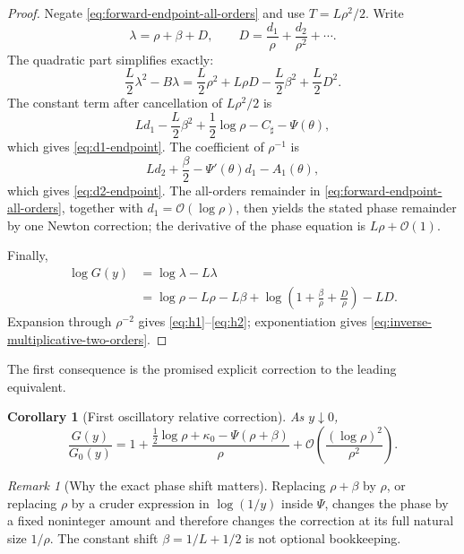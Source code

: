 \documentclass[11pt,oneside]{article}
\numberwithin{equation}{section}
\newtheorem{corollary}[theorem]{Corollary}
\theoremstyle{definition}
\theoremstyle{remark}
\newtheorem{remark}[theorem]{Remark}
\newcommand{\bigO}{\mathcal O}
\begin{document}
\begin{proof}
Negate \eqref{eq:forward-endpoint-all-orders} and use
$T=L\rho^2/2$.  Write
\begin{equation}
 \lambda=\rho+\beta+D,
 \qquad
 D=\frac{d_1}{\rho}+\frac{d_2}{\rho^2}+\cdots.
 \label{eq:lambda-D}
\end{equation}
The quadratic part simplifies exactly:
\begin{equation}
 \frac L2\lambda^2-B\lambda
 =\frac L2\rho^2+L\rho D-\frac L2\beta^2+\frac L2D^2.
 \label{eq:quadratic-cancellation}
\end{equation}
The constant term after cancellation of $L\rho^2/2$ is
\[
 Ld_1-\frac L2\beta^2+\frac12\log\rho-C_{\sharp}-\Psi(\theta),
\]
which gives \eqref{eq:d1-endpoint}.  The coefficient of $\rho^{-1}$ is
\[
 Ld_2+\frac\beta2-\Psi'(\theta)d_1-A_1(\theta),
\]
which gives \eqref{eq:d2-endpoint}.  The all-orders remainder in
\eqref{eq:forward-endpoint-all-orders}, together with $d_1=\bigO(\log\rho)$,
then yields the stated phase remainder by one Newton correction; the derivative of the
phase equation is $L\rho+\bigO(1)$.

Finally,
\begin{align*}
 \log G(y)
 &=\log\lambda-L\lambda\\
 &=\log\rho-L\rho-L\beta
   +\log\!\left(1+\frac\beta\rho+\frac D\rho\right)-LD.
\end{align*}
Expansion through $\rho^{-2}$ gives \eqref{eq:h1}--\eqref{eq:h2}; exponentiation
gives \eqref{eq:inverse-multiplicative-two-orders}.
\end{proof}

The first consequence is the promised explicit correction to the leading equivalent.

\begin{corollary}[First oscillatory relative correction]
\label{cor:first-oscillatory-inverse}
As $y\downarrow0$,
\begin{equation}
 \boxed{
 \frac{G(y)}{G_0(y)}
 =1+\frac{\tfrac12\log\rho+\kappa_0-\Psi(\rho+\beta)}{\rho}
 +\bigO\!\left(\frac{(\log\rho)^2}{\rho^2}\right).}
 \label{eq:first-oscillatory-inverse}
\end{equation}
\end{corollary}

\begin{remark}[Why the exact phase shift matters]
Replacing $\rho+\beta$ by $\rho$, or replacing $\rho$ by a cruder expression in
$\log(1/y)$ inside $\Psi$, changes the phase by a fixed noninteger amount and therefore
changes the correction at its full natural size $1/\rho$.  The constant shift
$\beta=1/L+1/2$ is not optional bookkeeping.
\end{remark}
\end{document}
